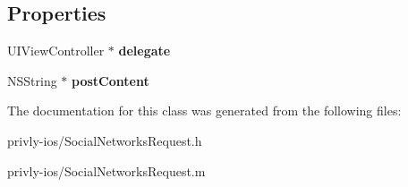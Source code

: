 \subsection*{Properties}
\begin{DoxyCompactItemize}
\item 
\hypertarget{interface_social_networks_request_a143e27a5d575ab752c8a00b39658f9ab}{U\-I\-View\-Controller $\ast$ {\bfseries delegate}}\label{interface_social_networks_request_a143e27a5d575ab752c8a00b39658f9ab}

\item 
\hypertarget{interface_social_networks_request_a4a1f36dc605e2f07a3185f70e22bb60a}{N\-S\-String $\ast$ {\bfseries post\-Content}}\label{interface_social_networks_request_a4a1f36dc605e2f07a3185f70e22bb60a}

\end{DoxyCompactItemize}


The documentation for this class was generated from the following files\-:\begin{DoxyCompactItemize}
\item 
privly-\/ios/Social\-Networks\-Request.\-h\item 
privly-\/ios/Social\-Networks\-Request.\-m\end{DoxyCompactItemize}
